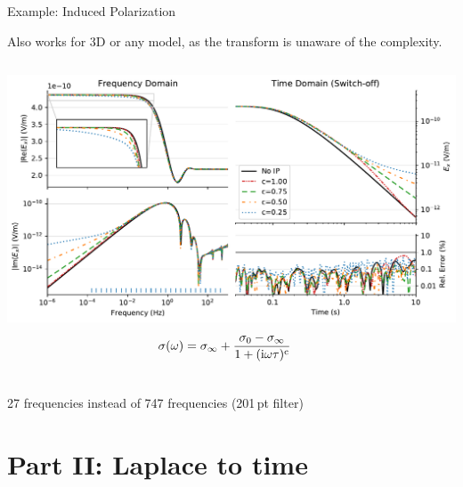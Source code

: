 \documentclass[xcolor=svgnames, usepdftitle=false, aspectratio=169]{beamer}
\newcommand{\ato}{\addtocounter{framenumber}{1}}
\begin{document}
\begin{frame}
  {Example: Induced Polarization}

  Also works for 3D or any model, as the transform is unaware of the
  complexity.

  \begin{columns}
      \includegraphics[width=\linewidth]{11-cole-cole-model}
      \begin{equation}
       ~\hspace{-.5cm} \sigma(\omega) = \sigma_\infty + \frac{\sigma_0 - \sigma_\infty}{1 +
          (\rm{i}\omega\tau)^c}
          \nonumber
      \end{equation}
  \end{columns}

  27 frequencies instead of 747 frequencies (201\,pt filter)

\end{frame}

\ato
\section{Part II: Laplace to time} %
\end{document}
